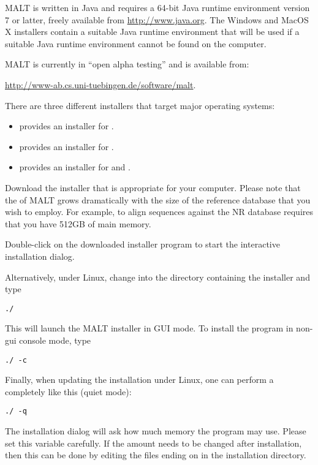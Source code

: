 \documentclass[11pt]{article}
\newcommand\MALT{{\sf MALT}\xspace}
\begin{document}
\MALT is written in Java and requires a 64-bit Java runtime environment
version 7 or latter, freely available from \url{http://www.java.org}.
The Windows and MacOS X installers contain a suitable Java runtime environment that will be used if
a suitable Java runtime environment cannot be found on the computer.

\MALT is currently in ``open alpha testing'' and is available from:

\url{http://www-ab.cs.uni-tuebingen.de/software/malt}.

There are three different installers that target major operating systems:
\begin{itemize}
\item {} provides an installer  for .
\item {} provides an installer for .
\item {} provides an installer for  and  .
\end{itemize}

Download the installer that is appropriate for your computer. Please note that the 
of \MALT grows dramatically with the size of the reference database that you wish to employ.
For example, to align sequences against the NR database requires that you have 512GB of main memory.

Double-click on the downloaded installer program  to start the interactive installation dialog.

Alternatively, under Linux, change into the directory containing the installer and type

{\tt ./}

This will launch the \MALT installer in GUI mode. To install the program in non-gui console mode,
type

{\tt ./ -c}

Finally, when updating the installation under Linux, one can perform a completely
 like this (quiet mode):

{\tt ./ -q}

The installation dialog will ask how much memory the program may use. Please set this variable carefully.
If the amount needs to be changed after installation, then this can be done by editing the files
ending on  in the installation directory.
\end{document}
